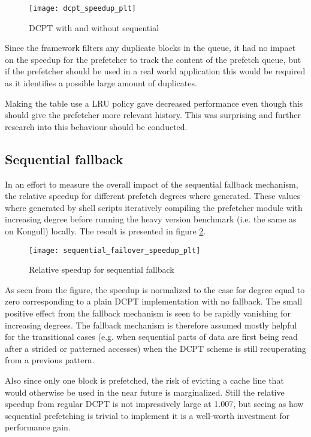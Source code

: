 \documentclass[12pt,journal,compsoc]{IEEEtran}
\begin{document}
\begin{figure}
\begin{center}
\texttt{[image: dcpt\_speedup\_plt]}
\end{center}
\caption{\label{fig:dcptspeed} DCPT with and without sequential}
\end{figure}

Since the framework filters any duplicate blocks in the queue,
it had no impact on the speedup for the prefetcher to track the content of
the prefetch queue, but if the prefetcher should be used in a real world
application this would be required as it identifies a possible large amount
of duplicates.

Making the table use a LRU policy gave decreased performance even though this
should give the prefetcher more relevant history. This was surprising and
further research into this behaviour should be conducted.

\subsection{Sequential fallback}
In an effort to measure the overall impact of the sequential fallback
mechanism, the relative speedup for different prefetch degrees where
generated. These values where generated by shell scripts iteratively
compiling the prefetcher module with increasing degree before running
the heavy version benchmark (i.e. the same as on Kongull) locally. The
result is presented in figure \ref{fig:fallback}.

\begin{figure}
\begin{center}
\texttt{[image: sequential\_failover\_speedup\_plt]}
\end{center}
\caption{\label{fig:fallback} Relative speedup for sequential fallback}
\end{figure}

As seen from the figure, the speedup is normalized to the case for degree equal
to zero corresponding to a plain DCPT implementation with no fallback. The
small positive effect from the fallback mechanism is seen to be rapidly
vanishing for increasing degrees. The fallback mechanism is therefore assumed
mostly helpful for the transitional cases (e.g. when sequential parts of data
are first being read after a strided or patterned accesses) when the DCPT
scheme is still recuperating from a previous pattern.

Also since only one block is prefetched, the risk of evicting a cache line
that would otherwise be used in the near future is marginalized. Still the
relative speedup from regular DCPT is not impressively large at 1.007, but
seeing as how sequential prefetching is trivial to implement it is a
well-worth investment for performance gain.
\end{document}
